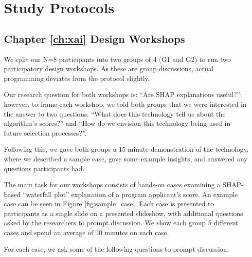 

\chapter{\label{app:protocolmockup}Study Protocols}

\minitoc

\section{Chapter \ref{ch:xai} Design Workshops}\label{app:xaiprotocol}
We split our N=8 participants into two groups of 4 (G1 and G2) to run two participatory design workshops. As these are group discussions, actual programming deviates from the protocol slightly.

Our research question for both workshops is: ``Are SHAP explanations useful?''; however, to frame each workshop, we told both groups that we were interested in the answer to two questions: ``What does this technology tell us about the algorithm’s scores?'' and ``How do we envision this technology being used in future selection processes?''.

Following this, we gave both groups a 15-minute demonstration of the technology, where we described a sample case, gave some example insights, and answered any questions participants had. 

The main task for our workshops consists of hands-on cases examining a SHAP-based ``waterfall plot'' explanation of a program applicant's score. An example case can be seen in Figure \ref{fig:sample_case}. Each case is presented to participants as a single slide on a presented slideshow, with additional questions asked by the researchers to prompt discussion. We show each group 5 different cases and spend an average of 10 minutes on each case.

For each case, we ask some of the following questions to prompt discussion:

